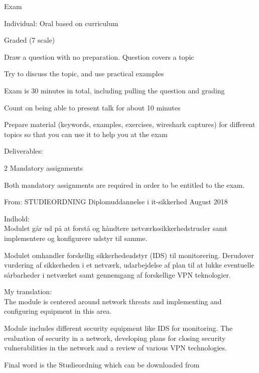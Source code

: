 \documentclass[Screen16to9,17pt]{foils}
\begin{document}
\begin{list2}
\item Exam
\item Individual: Oral based on curriculum
\item Graded (7 scale)
\item Draw a question with no preparation. Question covers a topic
\item Try to discuss the topic, and use practical examples
\item Exam is 30 minutes in total, including pulling the question and grading
\item Count on being able to present talk for about 10 minutes
\item Prepare material (keywords, examples, exercises, wireshark captures) for different topics so that you can use it to help you at the exam

\vskip 5mm
\item Deliverables:
\item 2 Mandatory assignments
\item Both mandatory assignments are required in order to be entitled to the exam.
\end{list2}



From: STUDIEORDNING Diplomuddannelse i it-sikkerhed August 2018

Indhold:\\
Modulet går ud på at forstå og håndtere netværkssikkerhedstrusler samt implementere og
konfigurere udstyr til samme.

Modulet omhandler forskellig sikkerhedsudstyr (IDS) til monitorering. Derudover vurdering af sikkerheden i et netværk, udarbejdelse af plan til at lukke eventuelle sårbarheder i netværket samt gennemgang af forskellige VPN teknologier.

My translation:\\
The module is centered around network threats and implementing and configuring equipment in this area.

Module includes different security equipment like IDS for monitoring.
The evaluation of security in a network, developing plans for closing security vulnerabilities in the network and a review of various VPN technologies.

Final word is the Studieordning which can be downloaded from\\
{\footnotesize {}\\
}
\end{document}
